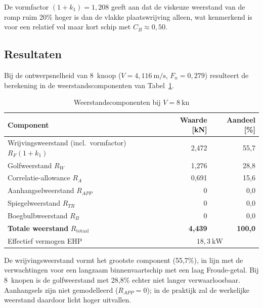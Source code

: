 De vormfactor $(1+k_1) = 1{,}208$ geeft aan dat de viskeuze weerstand van de romp ruim 20\%
hoger is dan de vlakke plaatswrijving alleen, wat kenmerkend is voor een relatief vol maar
kort schip met $C_B \approx 0{,}50$.
 
\subsection{Resultaten}
\label{subsec:holtrop-resultaten}
 
Bij de ontwerpsnelheid van 8~knoop ($V = 4{,}116\ \mathrm{m/s}$, $F_n = 0{,}279$) resulteert
de berekening in de weerstandscomponenten van Tabel~\ref{tab:holtrop_results_8kn}.
 
\begin{table}[H]
\centering
\caption{Weerstandscomponenten bij $V = 8\ \mathrm{kn}$}
\label{tab:holtrop_results_8kn}
\begin{tabular}{lrr}
\toprule
Component & Waarde [kN] & Aandeel [\%] \\
\midrule
Wrijvingsweerstand (incl.\ vormfactor) $R_F(1+k_1)$ & 2{,}472 & 55{,}7 \\
Golfweerstand $R_W$                                   & 1{,}276 & 28{,}8 \\
Correlatie-allowance $R_A$                            & 0{,}691 & 15{,}6 \\
Aanhangselweerstand $R_{APP}$                         & 0       &  0{,}0 \\
Spiegelweerstand $R_{TR}$                             & 0       &  0{,}0 \\
Boegbulbweerstand $R_B$                               & 0       &  0{,}0 \\
\midrule
\textbf{Totale weerstand} $R_\mathrm{totaal}$  & \textbf{4{,}439} & \textbf{100{,}0} \\
\midrule
Effectief vermogen EHP & \multicolumn{2}{c}{$18{,}3\ \mathrm{kW}$} \\
\bottomrule
\end{tabular}
\end{table}
 
De wrijvingsweerstand vormt het grootste component (55{,}7\%), in lijn met de verwachtingen voor
een langzaam binnenvaartschip met een laag Froude-getal. Bij 8~knopen is de golfweerstand met
28{,}8\% echter niet langer verwaarloosbaar. Aanhangsels zijn niet gemodelleerd
($R_{APP} = 0$); in de praktijk zal de werkelijke weerstand daardoor licht hoger uitvallen.
 
